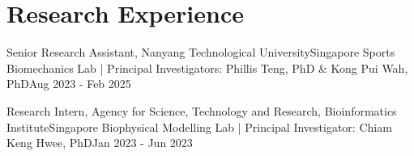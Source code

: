 \documentclass[../main.tex]{subfiles}
\begin{document}
\section{Research Experience}
  \vspace{2pt}
  \resumeSubHeadingListStart
    \resumeSubheading
      {Senior Research Assistant, Nanyang Technological University}{Singapore}
      {Sports Biomechanics Lab | Principal Investigators: Phillis Teng, PhD \& Kong Pui Wah, PhD}{Aug 2023 - Feb 2025}
  
    \resumeSubheading %
      {Research Intern, Agency for Science, Technology and Research, Bioinformatics Institute}{Singapore}
      {Biophysical Modelling Lab | Principal Investigator: Chiam Keng Hwee, PhD}{Jan 2023 - Jun 2023}
    
\end{document}
